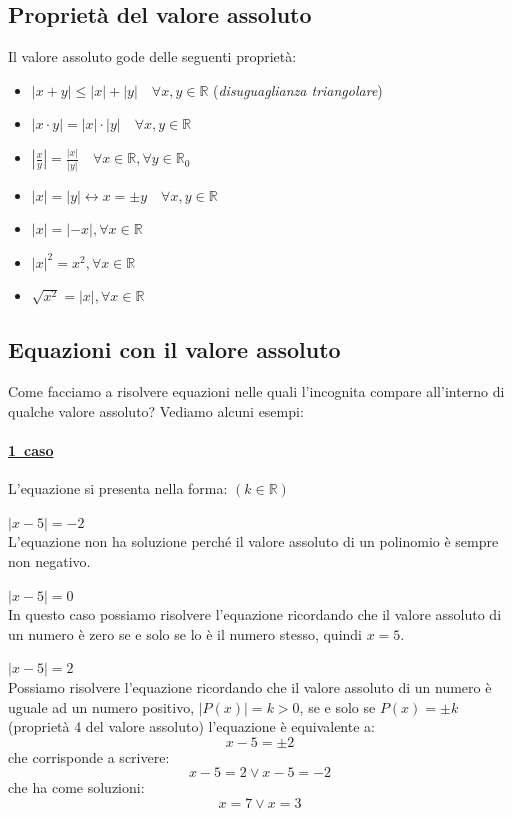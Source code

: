\subsection{Proprietà del valore assoluto}
Il valore assoluto gode delle seguenti proprietà:
\begin{itemize}
        \item \(|x+y|\leq |x|+|y| \quad \forall x,y \in \mathbb{R}\) \quad (\emph{disuguaglianza triangolare})
        \item \(|x\cdot y|=|x|\cdot |y| \quad  \forall x,y \in \mathbb{R}\)
        \item \(\left|\frac{x}{y} \right| =\frac{|x|}{|y|} \quad \forall x \in \mathbb{R}, 
\forall y \in \mathbb{R}_0\)
        \item \(|x|=|y| \longleftrightarrow x=\pm y \quad  \forall x,y \in \mathbb{R}\)
        \item \(|x|=|-x|, \forall x \in \mathbb{R}\)
        \item \(|x|^2=x^2, \forall x \in \mathbb{R}\)
        \item \(\sqrt{x^2}=|x|, \forall x \in \mathbb{R}\)
\end{itemize}

\subsection{Equazioni con il valore assoluto}
Come facciamo a risolvere equazioni nelle quali l'incognita compare all'interno 
di qualche valore assoluto? Vediamo alcuni esempi:
\paragraph{\underline{1\textdegree~caso}} L'equazione si presenta nella forma:   \quad $(k\in \mathbb{R})$
\begin{esempio} 
$|x-5|=-2$ \\[4pt]
L'equazione non ha soluzione perché il valore assoluto di un polinomio è sempre non negativo.
\end{esempio}
\begin{esempio}  
$|x-5|=0$ \\[4pt]
In questo caso possiamo risolvere l'equazione ricordando che il valore assoluto di un numero è zero se e solo se 
lo è il numero stesso, quindi $x=5$.
\end{esempio}
\begin{esempio}  
$|x-5|=2$ \\[4pt]
Possiamo risolvere l'equazione ricordando che  il valore assoluto di un numero è uguale 
ad un numero positivo, $|P(x)|=k>0$, se e solo se $P(x)=\pm k$ (proprietà 4 del 
valore assoluto) l'equazione è equivalente a:
$$x-5=\pm 2$$
che corrisponde a scrivere:
$$x-5= 2 \vee x-5=-2$$
che ha come soluzioni:
$$x=7 \vee x=3$$
\end{esempio}

